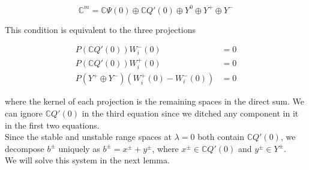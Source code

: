 \documentclass[12pt]{article}
\def\C{{\mathbb C}}
\begin{document}
\[
\C^m = \C \Psi(0) \oplus \C Q'(0) \oplus Y^0 \oplus Y^+ \oplus Y^- 
\]

This condition is equivalent to the three projections

\begin{align*}
P(\C Q'(0))W_i^-(0) &= 0 \\
P(\C Q'(0))W_i^+(0) &= 0 \\
P(Y^+ \oplus Y^-) ( W_i^+(0) - W_i^-(0) ) &= 0
\end{align*}

where the kernel of each projection is the remaining spaces in the direct sum. We can ignore $\C Q'(0)$ in the third equation since we ditched any component in it in the first two equations.\\

Since the stable and unstable range spaces at $\lambda = 0$ both contain $\C Q'(0)$, we decompose $b^\pm$ uniquely as $b^\pm = x^\pm + y^\pm$, where $x^\pm \in \C Q'(0)$ and $y^\pm \in Y^\pm$.\\

We will solve this system in the next lemma.

\end{document}
